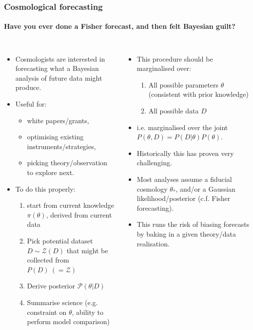 \documentclass[aspectratio=169]{beamer}
\begin{document}
\begin{frame}
    \frametitle{Cosmological forecasting}
    \framesubtitle{Have you ever done a Fisher forecast, and then felt Bayesian guilt?}
    \vspace{-20pt}
    \begin{columns}[t]
        \begin{itemize}
            \item Cosmologists are interested in forecasting what a Bayesian analysis of future data might produce.
            \item Useful for:
                \begin{itemize}
                    \item white papers/grants,
                    \item optimising existing instruments/strategies,
                    \item picking theory/observation to explore next.
                \end{itemize}
            \item To do this properly:
                \begin{enumerate}
                    \item start from current knowledge $\pi(\theta)$, derived from current data
                    \item Pick potential dataset $D\sim\mathcal{Z}(D)$ that might be collected from $P(D)\: (=\mathcal{Z})$
\item Derive posterior $\mathcal{P}(\theta|D)$
                    \item Summarise science (e.g. constraint on $\theta$, ability to perform model comparison)
                \end{enumerate}
        \end{itemize}

        \begin{itemize}
            \item This procedure should be marginalised over:
                \begin{enumerate}
                    \item All possible parameters $\theta$ (consistent with prior knowledge)
                    \item All possible data $D$
                \end{enumerate}
            \item i.e. marginalised over the joint $P(\theta,D)=P(D|\theta)P(\theta)$.
            \item Historically this has proven very challenging.
            \item Most analyses assume a fiducial cosmology $\theta_*$, and/or a Gaussian likelihood/posterior (c.f. Fisher forecasting).
            \item This runs the risk of biasing forecasts by baking in a given theory/data realisation.
        \end{itemize}
        
    \end{columns}

\end{frame}
\end{document}
